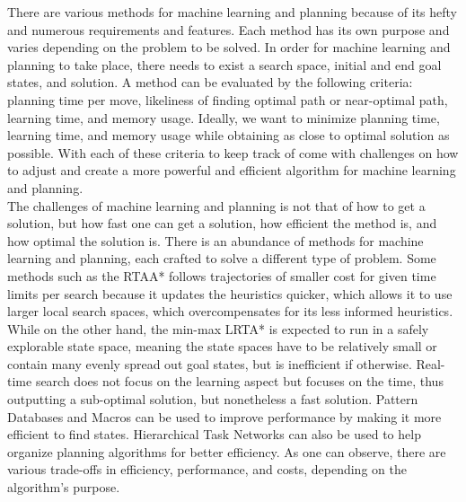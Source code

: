 \documentclass[tog]{acmsiggraph}
\begin{document}
\indent There are various methods for machine learning and planning because of its hefty and numerous requirements and features. Each method has its own purpose and varies depending on the problem to be solved. In order for machine learning and planning to take place, there needs to exist a search space, initial and end goal states, and solution. A method can be evaluated by the following criteria: planning time per move, likeliness of finding optimal path or near-optimal path, learning time, and memory usage. Ideally, we want to minimize planning time, learning time, and memory usage while obtaining as close to optimal solution as possible. With each of these criteria to keep track of come with challenges on how to adjust and create a more powerful and efficient algorithm for machine learning and planning.
\\
\indent The challenges of machine learning and planning is not that of how to get a solution, but how fast one can get a solution, how efficient the method is, and how optimal the solution is. There is an abundance of methods for machine learning and planning, each crafted to solve a different type of problem. Some methods such as the RTAA* follows trajectories of smaller cost for given time limits per search because it updates the heuristics quicker, which allows it to use larger local search spaces, which overcompensates for its less informed heuristics. While on the other hand, the min-max LRTA* is expected to run in a safely explorable state space, meaning the state spaces have to be relatively small or contain many evenly spread out goal states, but is inefficient if otherwise. Real-time search does not focus on the learning aspect but focuses on the time, thus outputting a sub-optimal solution, but nonetheless a fast solution. Pattern Databases and Macros can be used to improve performance by making it more efficient to find states. Hierarchical Task Networks can also be used to help organize planning algorithms for better efficiency. As one can observe, there are various trade-offs in efficiency, performance, and costs, depending on the algorithm's purpose.
\\
\end{document}
